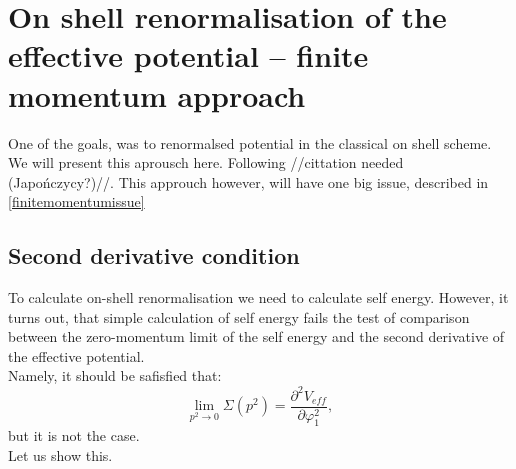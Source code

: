 \chapter{On shell renormalisation of the effective potential -- finite momentum approach}
One of the goals, was to renormalsed potential in the classical on shell scheme. 
We will present this aprousch here. Following //cittation needed (Japończycy?)//.
This approuch however, will have one big issue, described in \ref{finitemomentumissue}
\section{Second derivative condition}
To calculate on-shell renormalisation we need to calculate self energy. 
However, it turns out, that simple calculation of self energy fails the test of 
comparison between the zero-momentum limit of the self energy and the second derivative 
of the effective potential. \\

Namely, it should be safisfied that:
\begin{equation}\label{second_derivativ_condition}
\lim\limits_{p^2\to 0}\Sigma(p^2)=\frac{\partial^2V_{eff}}{\partial\varphi_1^2},
\end{equation}
but it is not the case. \\

Let us show this. \\

